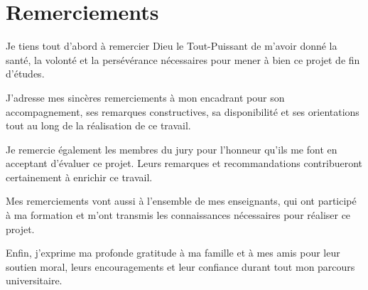 \chapter*{Remerciements}

Je tiens tout d'abord à remercier Dieu le Tout-Puissant de m'avoir donné la santé, la volonté et la persévérance nécessaires pour mener à bien ce projet de fin d'études.

J'adresse mes sincères remerciements à mon encadrant pour son accompagnement, ses remarques constructives, sa disponibilité et ses orientations tout au long de la réalisation de ce travail.

Je remercie également les membres du jury pour l'honneur qu'ils me font en acceptant d'évaluer ce projet. Leurs remarques et recommandations contribueront certainement à enrichir ce travail.

Mes remerciements vont aussi à l'ensemble de mes enseignants, qui ont participé à ma formation et m'ont transmis les connaissances nécessaires pour réaliser ce projet.

Enfin, j'exprime ma profonde gratitude à ma famille et à mes amis pour leur soutien moral, leurs encouragements et leur confiance durant tout mon parcours universitaire.
